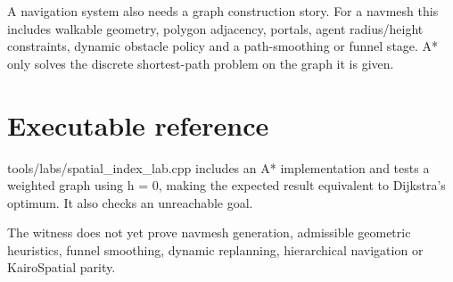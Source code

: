 A navigation system also needs a graph construction story. For a navmesh this includes walkable geometry, polygon adjacency, portals, agent radius/height constraints, dynamic obstacle policy and a path-smoothing or funnel stage. A* only solves the discrete shortest-path problem on the graph it is given.

\section{Executable reference}\label{appendix-5803241aa1a5-executable-reference}

tools/labs/spatial\_index\_lab.cpp includes an A* implementation and tests a weighted graph using h = 0, making the expected result equivalent to Dijkstra's optimum. It also checks an unreachable goal.

The witness does not yet prove navmesh generation, admissible geometric heuristics, funnel smoothing, dynamic replanning, hierarchical navigation or KairoSpatial parity.
